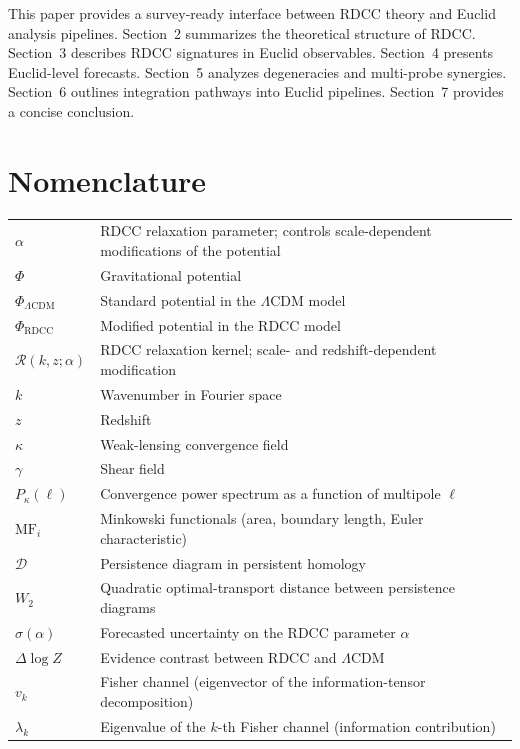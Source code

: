 \documentclass[11pt,a4paper]{article}
\begin{document}
This paper provides a survey-ready interface between RDCC theory and Euclid
analysis pipelines. Section~2 summarizes the theoretical structure of RDCC.
Section~3 describes RDCC signatures in Euclid observables. Section~4 presents
Euclid-level forecasts. Section~5 analyzes degeneracies and multi-probe synergies.
Section~6 outlines integration pathways into Euclid pipelines. Section~7 provides
a concise conclusion.


\section*{Nomenclature}

\begin{tabular}{ll}
$\alpha$ & RDCC relaxation parameter; controls scale-dependent modifications of the potential \\[4pt]
$\Phi$ & Gravitational potential \\[4pt]
$\Phi_{\Lambda\mathrm{CDM}}$ & Standard potential in the $\Lambda$CDM model \\[4pt]
$\Phi_{\mathrm{RDCC}}$ & Modified potential in the RDCC model \\[4pt]
$\mathcal{R}(k,z;\alpha)$ & RDCC relaxation kernel; scale- and redshift-dependent modification \\[4pt]
$k$ & Wavenumber in Fourier space \\[4pt]
$z$ & Redshift \\[4pt]
$\kappa$ & Weak-lensing convergence field \\[4pt]
$\gamma$ & Shear field \\[4pt]
$P_{\kappa}(\ell)$ & Convergence power spectrum as a function of multipole $\ell$ \\[4pt]
$\mathrm{MF}_{i}$ & Minkowski functionals (area, boundary length, Euler characteristic) \\[4pt]
$\mathcal{D}$ & Persistence diagram in persistent homology \\[4pt]
$W_{2}$ & Quadratic optimal-transport distance between persistence diagrams \\[4pt]
$\sigma(\alpha)$ & Forecasted uncertainty on the RDCC parameter $\alpha$ \\[4pt]
$\Delta \log Z$ & Evidence contrast between RDCC and $\Lambda$CDM \\[4pt]
$v_{k}$ & Fisher channel (eigenvector of the information-tensor decomposition) \\[4pt]
$\lambda_{k}$ & Eigenvalue of the $k$-th Fisher channel (information contribution) \\[4pt]
\end{tabular}
\end{document}
